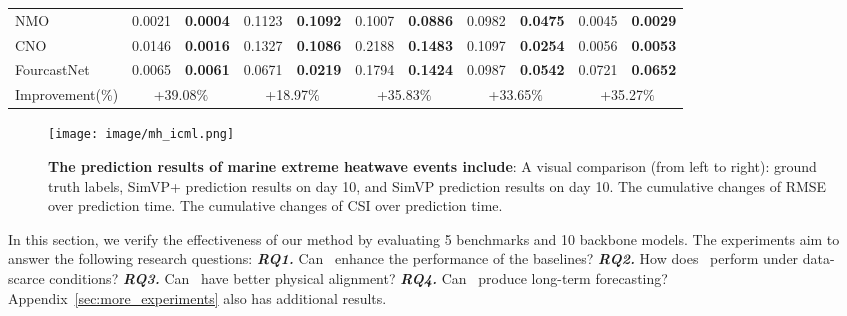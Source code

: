 \begin{table*}[htbp]
\begin{sc}
{\begin{tabular}{l|cc|cc|cc|cc|cc}
        NMO &0.0021 &\textbf{0.0004}  &0.1123  & \textbf{0.1092} & 0.1007 & \textbf{0.0886} &0.0982  &\textbf{0.0475}  & 0.0045 & \textbf{0.0029}  \\
        CNO & 0.0146&  \textbf{0.0016}& 0.1327 & \textbf{0.1086} &0.2188 & \textbf{0.1483} &0.1097  &  \textbf{0.0254}&0.0056 &  \textbf{0.0053}  \\
        FourcastNet &0.0065 &\textbf{0.0061}  & 0.0671 & \textbf{0.0219} & 0.1794 &\textbf{0.1424}  &0.0987  &\textbf{0.0542}  & 0.0721 &\textbf{0.0652}   \\
        \midrule
         Improvement(\%)& \multicolumn{2}{c|}{+39.08$\%$}  &  \multicolumn{2}{c|}{+18.97$\%$}   &   \multicolumn{2}{c|}{+35.83$\%$}   &  \multicolumn{2}{c|}{+33.65$\%$}   &  \multicolumn{2}{c}{+35.27$\%$}   \\
        \bottomrule
      \end{tabular}
    }
  \end{sc}
\end{table*}
\begin{figure*}[t]
    \centering
    \texttt{[image: image/mh\_icml.png]}
    \caption{\textbf{The prediction results of marine extreme heatwave events include}: A visual comparison (from left to right): ground truth labels, SimVP+\method{} prediction results on day 10, and SimVP prediction results on day 10. The cumulative changes of RMSE over prediction time. The cumulative changes of CSI over prediction time.}
    \label{fig:mh_icml}
\end{figure*}
In this section, we verify the effectiveness of our method by evaluating 5 benchmarks and 10 backbone models. The experiments aim to answer the following research questions:
\textit{{\textbf{RQ1.}}} Can~\method{} enhance the performance of the baselines? 
\textit{{\textbf{RQ2.}}} How does~\method{} perform under data-scarce conditions?
\textit{\textbf{RQ3.}} Can~\method{} have better physical alignment? 
\textit{\textbf{RQ4.}} Can~\method{} produce long-term forecasting?  
Appendix~\ref{sec:more_experiments} also has additional results.

